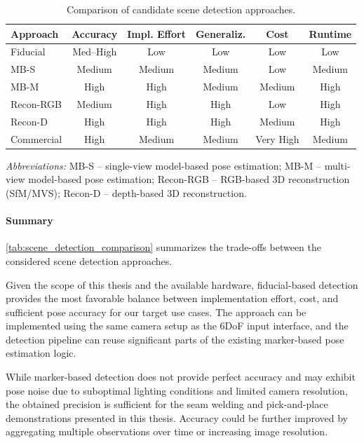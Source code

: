 \begin{table}[t]
\centering
\caption{Comparison of candidate scene detection approaches.}
\label{tab:scene_detection_comparison}

\small

\begin{tabular}{l c c c c c}
\toprule
Approach & Accuracy & Impl. Effort & Generaliz. & Cost & Runtime \\
\midrule
Fiducial & Med--High & Low & Low & Low & Low \\
MB-S & Medium & Medium & Medium & Low & Medium \\
MB-M & High & High & Medium & Medium & High \\
Recon-RGB & Medium & High & High & Low & High \\
Recon-D & High & High & High & Medium & High \\
Commercial & High & Medium & Medium & Very High & Medium \\
\bottomrule
\end{tabular}

\vspace{0.4em}
\footnotesize
\emph{Abbreviations:}
MB-S – single-view model-based pose estimation;
MB-M – multi-view model-based pose estimation;
Recon-RGB – RGB-based 3D reconstruction (SfM/MVS);
Recon-D – depth-based 3D reconstruction.
\end{table}

\paragraph{Summary}
\autoref{tab:scene_detection_comparison} summarizes the trade-offs between the considered scene detection approaches. 

Given the scope of this thesis and the available hardware, fiducial-based detection provides the most favorable balance between implementation effort, cost, and sufficient pose accuracy for our target use cases. The approach can be implemented using the same camera setup as the 6DoF input interface, and the detection pipeline can reuse significant parts of the existing marker-based pose estimation logic.

While marker-based detection does not provide perfect accuracy and may exhibit pose noise due to suboptimal lighting conditions and limited camera resolution, the obtained precision is sufficient for the seam welding and pick-and-place demonstrations presented in this thesis. Accuracy could be further improved by aggregating multiple observations over time or increasing image resolution.

